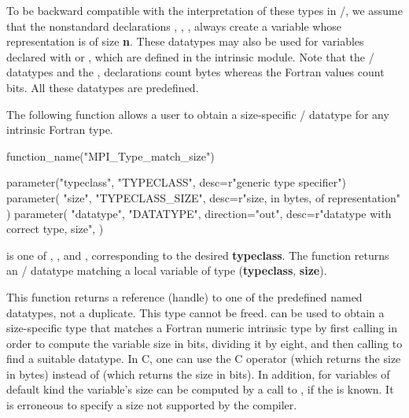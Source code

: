 To be backward compatible with the interpretation of
these types in \MPII/, we assume that the nonstandard declarations
, , , always create a variable whose
representation is of size \textbf{n}.
These datatypes may also be used for variables declared with
 or ,
which are defined in the  intrinsic module.
Note that the \MPI/ datatypes and the , 
declarations count bytes whereas
the Fortran  values count bits.
All these datatypes are predefined.

The following function allows a user to obtain a size-specific \MPI/ datatype
for any intrinsic Fortran type.

\begin{mpi-binding}
    function_name("MPI_Type_match_size")

    parameter("typeclass", "TYPECLASS", desc=r"generic type specifier")
    parameter(
        "size", "TYPECLASS_SIZE", desc=r"size, in bytes, of representation"
    )
    parameter(
        "datatype",
        "DATATYPE",
        direction="out",
        desc=r"datatype with correct type, size",
    )
\end{mpi-binding}

 is one of ,
, and
,
corresponding to the  desired \textbf{typeclass}.  The function returns
an \MPI/ datatype matching a local variable of type (\textbf{typeclass},
\textbf{size}).

This function
returns a reference (handle) to one of the predefined named
datatypes, not a duplicate. This type cannot be freed.
 can be used to obtain a size-specific type that
matches a Fortran numeric intrinsic type by first calling
 in order to compute the variable size in bits,
dividing it by eight, and then
calling  to find a suitable
datatype.
In C,
one can use the C operator  (which returns the size
in bytes) instead of  (which returns the size in
bits).
In addition, for variables of default kind
the variable's size can be computed by a call to
, if the  is known.
It is erroneous to specify a size not supported by the compiler.


